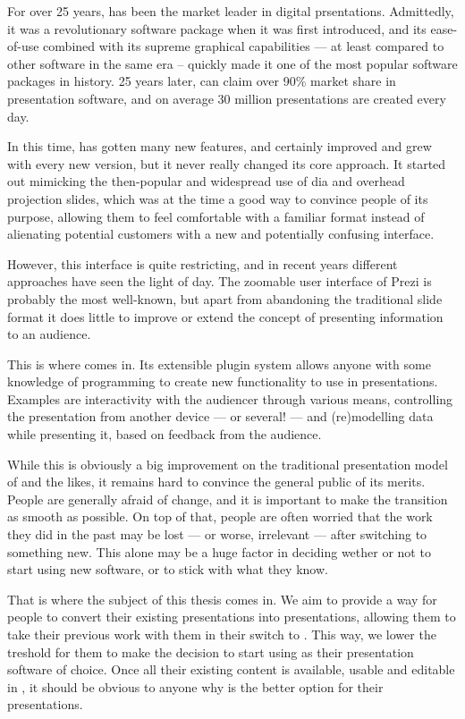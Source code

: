 \documentclass[a4paper,12pt]{report}
\begin{document}
  For over 25 years, \ppt has been the market leader in digital prsentations.
  Admittedly, it was a revolutionary software package when it was first
  introduced, and its ease-of-use combined with its supreme graphical
  capabilities --- at least compared to other software in the same era --
  quickly made it one of the most popular software packages in history. 25
  years later, \ppt can claim over 90\% market share in presentation software,
  and on average 30 million \ppt presentations are created every day.

  In this time, \ppt has gotten many new features, and certainly improved and
  grew with every new version, but it never really changed its core approach.
  It started out mimicking the then-popular and widespread use of dia and
  overhead projection slides, which was at the time a good way to convince
  people of its purpose, allowing them to feel comfortable with a familiar
  format instead of alienating potential customers with a new and potentially
  confusing interface.

  However, this interface is quite restricting, and in recent years different
  approaches have seen the light of day. The zoomable user interface of Prezi
  is probably the most well-known, but apart from abandoning the traditional
  slide format it does little to improve or extend the concept of presenting
  information to an audience.

  This is where \mxp comes in. Its extensible plugin system allows anyone with
  some knowledge of programming to create new functionality to use in
  presentations. Examples are interactivity with the audiencer through various
  means, controlling the presentation from another device --- or several! ---
  and (re)modelling data while presenting it, based on feedback from the
  audience.

  While this is obviously a big improvement on the traditional presentation
  model of \ppt and the likes, it remains hard to convince the general public
  of its merits. People are generally afraid of change, and it is important to
  make the transition as smooth as possible. On top of that, people are often
  worried that the work they did in the past may be lost --- or worse,
  irrelevant --- after switching to something new. This alone may be a huge
  factor in deciding wether or not to start using new software, or to stick
  with what they know.

  That is where the subject of this thesis comes in. We aim to provide a way
  for people to convert their existing \ppt presentations into \mxp
  presentations, allowing them to take their previous work with them in their
  switch to \mxp. This way, we lower the treshold for them to make the decision
  to start using \mxp as their presentation software of choice. Once all their
  existing \ppt content is available, usable and editable in \mxp, it should be
  obvious to anyone why \mxp is the better option for their presentations.
\end{document}
